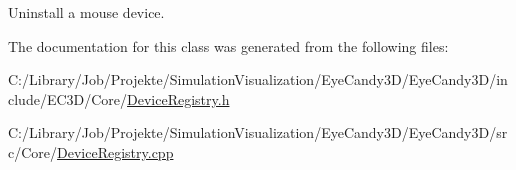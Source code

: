 Uninstall a mouse device. 



The documentation for this class was generated from the following files\+:\begin{DoxyCompactItemize}
\item 
C\+:/\+Library/\+Job/\+Projekte/\+Simulation\+Visualization/\+Eye\+Candy3\+D/\+Eye\+Candy3\+D/include/\+E\+C3\+D/\+Core/\mbox{\hyperlink{_device_registry_8h}{Device\+Registry.\+h}}\item 
C\+:/\+Library/\+Job/\+Projekte/\+Simulation\+Visualization/\+Eye\+Candy3\+D/\+Eye\+Candy3\+D/src/\+Core/\mbox{\hyperlink{_device_registry_8cpp}{Device\+Registry.\+cpp}}\end{DoxyCompactItemize}
